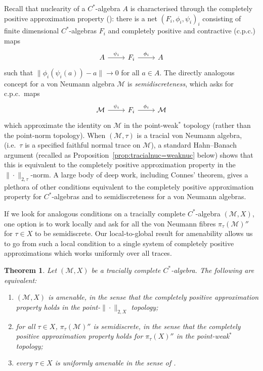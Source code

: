 \documentclass[a4paper,11pt]{amsart}
\newtheorem{theorem}{Theorem}
\theoremstyle{definition}
\numberwithin{equation}{section}
\numberwithin{theorem}{section}
\newcommand{\M}{\mathcal{M}}
\begin{document}
Recall that nuclearity of a $C^*$-algebra $A$ is characterised through the completely positive approximation property (\cite{Ki77}): there is a net  $(F_i,\phi_i,\psi_i)_i$ consisting of finite dimensional $C^*$-algebras $F_i$ and completely positive and contractive (c.p.c.) maps
\begin{equation}
\begin{tikzcd}
    A\ar[r,"\psi_i"] & F_i\ar[r,"\phi_i"]&A
\end{tikzcd}
\end{equation}
such that $\|\phi_i(\psi_i(a))-a\|\to 0$ for all $a\in A$.  The directly analogous concept for a von Neumann algebra $\M$ is \emph{semidiscreteness}, which asks for 
c.p.c.\ maps
\begin{equation}\label{Intro:CPAP1}
\begin{tikzcd}
    \M\ar[r,"\psi_i"] & F_i\ar[r,"\phi_i"]&\M
\end{tikzcd}
\end{equation}
which approximate the identity on $\M$ in the point-weak$^*$ topology (rather than the point-norm topology).  When $(\M,\tau)$ is a tracial von Neumann algebra, (i.e.\ $\tau$ is a specified faithful normal trace on $\M$), a standard Hahn--Banach argument (recalled as Proposition~\ref{prop:tracialnuc=weaknuc} below) shows that this is equivalent to the completely positive approximation property in the $\|\cdot\|_{2,\tau}$-norm.  A large body of deep work, including Connes' theorem, gives a plethora of other conditions equivalent to the completely positive approximation property for $C^*$-algebras and to semidiscreteness for a von Neumann algebras. 

If we look for analogous conditions on a tracially complete $C^*$-algebra $(\M,X)$, one option is to work locally and ask for all the von Neumann fibres $\pi_\tau(\M)''$ for $\tau\in X$ to be  semidiscrete. Our local-to-global result for amenability allows us to go from such a local condition to a single system of completely positive approximations which works uniformly over all traces. 

\begin{theorem}\label{thm:introamenable}
Let $(\mathcal M,X)$ be a tracially complete $C^*$-algebra.  The following are equivalent:
\begin{enumerate}
        \item $(\M, X)$ is {}amenable, in the sense that the completely positive approximation property holds in the point-$\|\cdot\|_{2,X}$ topology;
        \item for all $\tau \in X$, $\pi_\tau(\M)''$ is semidiscrete, in the sense that the completely positive approximation property holds for $\pi_\tau(X)''$ in the point-weak$^*$ topology;
        \item every $\tau \in X$ is uniformly amenable in the sense of \cite[Definition~3.2.1]{Bro06}.
\end{enumerate}
\end{theorem}
\end{document}
